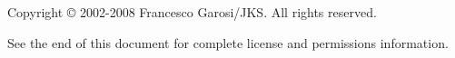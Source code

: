 Copyright \copyright{} 2002-2008 Francesco Garosi/JKS.
All rights reserved.

See the end of this document for complete license and permissions
information.
